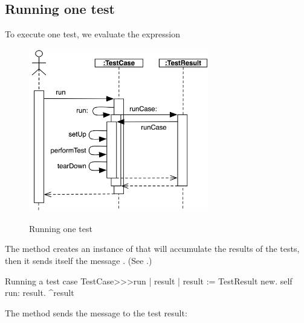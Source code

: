 \documentclass[a4paper,10pt,twoside]{book}
\begin{document}
{\subsection{Running one test}

To execute one test, we evaluate the expression


\begin{figure}[tbh]
  \begin{center}
		{\includegraphics[width=0.7\textwidth]{sunit-scenario}}
	\caption{Running one test}
  \end{center}
\end{figure}

The method  creates an instance of
 that will accumulate the results of the
tests, then it sends itself the message .
(See .)

\begin{method}[tastecaserun]{Running a test case}
TestCase>>>run
	| result |
	result := TestResult new.
	self run: result.
	^result
\end{method}


The method
 sends the message
 to the test result:

}
\end{document}
